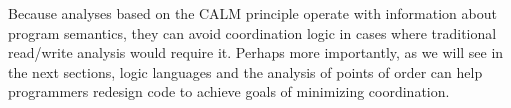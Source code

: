 Because analyses based on the CALM principle operate with information about program semantics, they can avoid coordination logic in cases where traditional read/write analysis would require it.  Perhaps more importantly, as we will see in the next sections, logic languages and the analysis of points of order can help programmers redesign code to achieve goals of minimizing coordination.


% 



